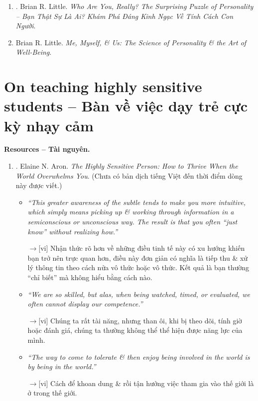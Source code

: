 \documentclass[12pt,oneside]{book}
\begin{document}
\begin{enumerate}
\begin{itemize}
		{\sf Content}: What makes you an introvert $\to$ Early memories $\to$ High on neuroticism.
		
		{\sf[en]$\to$[vi]} {\sf Nội dung}: Điều gì khiến bạn trở thành người hướng nội $\to$ Ký ức ban đầu $\to$ Dễ bị kích động.
	\end{itemize}
	Với bản dịch tiếng Việt:
	\item \cite{Little_personality_VN}. {\sc Brian R. Little}. {\it Who Are You, Really? The Surprising Puzzle of Personality -- Bạn Thật Sự Là Ai? Khám Phá Đáng Kinh Ngạc Về Tính Cách Con Người}.
	\item {\sc Brian R. Little}. {\it Me, Myself, \& Us: The Science of Personality \& the Art of Well-Being}.
\end{enumerate}

\section{On teaching highly sensitive students -- Bàn về việc dạy trẻ cực kỳ nhạy cảm}
{\bf \textsf{Resources -- Tài nguyên.}}
\begin{enumerate}
	\item \cite{Aron_HSP}. {\sc Elaine N. Aron}. {\it The Highly Sensitive Person: How to Thrive When the World Overwhelms You}. (Chưa có bản dịch tiếng Việt đến thời điểm dòng này được viết.)
	\begin{itemize}
		\item {\it``This greater awareness of the subtle tends to make you more intuitive, which simply means picking up \& working through information in a semiconscious or unconscious way. The result is that you often ``just know'' without realizing how.''}
		
		{\sf[en]$\to$[vi]} Nhận thức rõ hơn về những điều tinh tế này có xu hướng khiến bạn trở nên trực quan hơn, điều này đơn giản có nghĩa là tiếp thu \& xử lý thông tin theo cách nửa vô thức hoặc vô thức. Kết quả là bạn thường ``chỉ biết'' mà không hiểu bằng cách nào.		
		
		\item {\it``We are so skilled, but alas, when being watched, timed, or evaluated, we often cannot display our competence.''}
		
		{\sf[en]$\to$[vi]} Chúng ta rất tài năng, nhưng than ôi, khi bị theo dõi, tính giờ hoặc đánh giá, chúng ta thường không thể thể hiện được năng lực của mình.
		
		\item {\it``The way to come to tolerate \& then enjoy being involved in the world is by being in the world.''}
		
		{\sf[en]$\to$[vi]} Cách để khoan dung \& rồi tận hưởng việc tham gia vào thế giới là ở trong thế giới.
	\end{itemize}
\end{enumerate}
\end{document}
